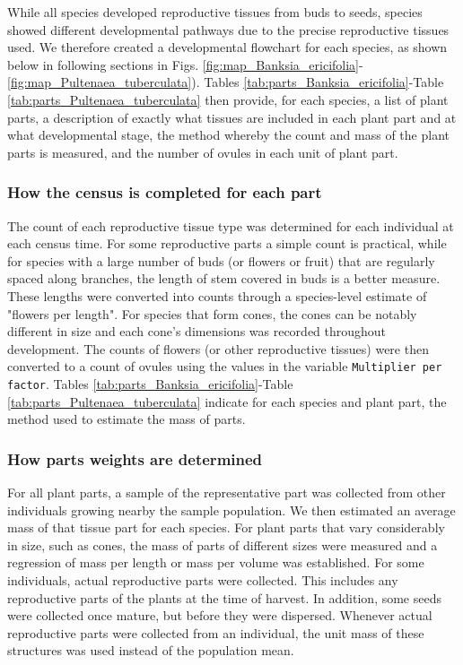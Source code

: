 \documentclass[10pt,twoside]{article}\usepackage[]{graphicx}\usepackage[]{color}
\begin{document}
While all species developed reproductive tissues from buds to seeds, species showed different developmental pathways due to the precise reproductive tissues used. We therefore created a developmental flowchart for each species, as shown below in following sections in Figs. \ref{fig:map_Banksia_ericifolia}-\ref{fig:map_Pultenaea_tuberculata}). Tables \ref{tab:parts_Banksia_ericifolia}-Table \ref{tab:parts_Pultenaea_tuberculata} then provide, for each species, a list of plant parts, a description of exactly what tissues are included in each plant part and at what developmental stage, the method whereby the count and mass of the plant parts is measured, and the number of ovules in each unit of plant part.

\subsubsection{How the census is completed for each part}

The count of each reproductive tissue type was determined for each individual at each census time. For some reproductive parts a simple count is practical, while for species with a large number of buds (or flowers or fruit) that are regularly spaced along branches, the length of stem covered in buds is a better measure. These lengths were converted into counts through a species-level estimate of "flowers per length". For species that form cones, the cones can be notably different in size and each cone's dimensions was recorded throughout development. The counts of flowers (or other reproductive tissues) were then converted to a count of ovules using the values in the variable \texttt{Multiplier per factor}. Tables \ref{tab:parts_Banksia_ericifolia}-Table \ref{tab:parts_Pultenaea_tuberculata} indicate for each species and plant part, the method used to estimate the mass of parts.


\subsubsection{How parts weights are determined}

For all plant parts, a sample of the representative part was collected from other individuals growing nearby the sample population. We then estimated an average mass of that tissue part for each species. For plant parts that vary considerably in size, such as cones, the mass of parts of different sizes were measured and a regression of mass per length or mass per volume was established. For some individuals, actual reproductive parts were collected. This includes any reproductive parts of the plants at the time of harvest. In addition, some seeds were collected once mature, but before they were dispersed. Whenever actual reproductive parts were collected from an individual, the unit mass of these structures was used instead of the population mean.
\end{document}
